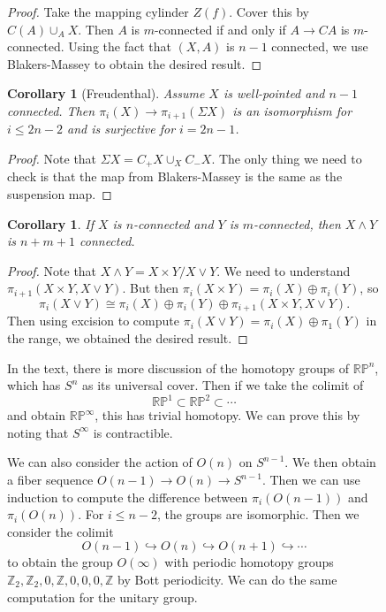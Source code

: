 \documentclass[leqno, openany]{memoir}
\newtheorem{cor}[thm]{Corollary}
\theoremstyle{definition}
\theoremstyle{remark}
\theoremstyle{plain}
\theoremstyle{definition}
\theoremstyle{remark}
\newcommand{\R}{\mathbb{R}}
\newcommand{\Z}{\mathbb{Z}}
\renewcommand{\P}{\mathbb{P}}
\begin{document}
\begin{figure}[H]
\begin{proof} Take the mapping cylinder $Z(f)$. Cover this by $C(A) \cup_A X$.
    Then $A$ is $m$-connected if and only if $A \to CA$ is $m$-connected. Using
    the fact that $(X,A)$ is $n-1$ connected, we use Blakers-Massey to obtain
    the desired result.  \end{proof}

\begin{cor}[Freudenthal] Assume $X$ is well-pointed and $n-1$ connected. Then
$\pi_i(X) \to \pi_{i+1}(\Sigma X)$ is an isomorphism for $i \leq 2n-2$ and is
surjective for $i = 2n-1$.  \end{cor}

\begin{proof} Note that $\Sigma X = C_+X \cup_X C_-X$. The only thing we need
to check is that the map from Blakers-Massey is the same as the suspension map.
\end{proof}

\begin{cor} If $X$ is $n$-connected and $Y$ is $m$-connected, then $X \wedge Y$
is $n+m+1$ connected.  \end{cor}

\begin{proof} Note that $X \wedge Y = X \times Y / X \vee Y$. We need to
    understand $\pi_{i+1}(X \times Y, X \vee Y)$. But then $\pi_i(X \times Y) =
    \pi_i(X) \oplus \pi_i(Y)$, so \[ \pi_i(X \vee Y) \cong \pi_i(X) \oplus
    \pi_i(Y) \oplus \pi_{i+1}(X \times Y, X \vee Y). \] Then using excision to
compute $\pi_i(X \vee Y) = \pi_i(X) \oplus \pi_1(Y)$ in the range, we obtained
the desired result.  \end{proof}

In the text, there is more discussion of the homotopy groups of $\R\P^n$, which
has $S^n$ as its universal cover. Then if we take the colimit of \[ \R\P^1
\subset \R\P^2 \subset \cdots \] and obtain $\R\P^{\infty}$, this has trivial
homotopy. We can prove this by noting that $S^{\infty}$ is contractible.

We can also consider the action of $O(n)$ on $S^{n-1}$. We then obtain a fiber
sequence $O(n-1) \to O(n) \to S^{n-1}$. Then we can use induction to compute
the difference between $\pi_i(O(n-1))$ and $\pi_i(O(n))$. For $i \leq n-2$, the
groups are isomorphic. Then we consider the colimit \[ O(n-1) \hookrightarrow
O(n) \hookrightarrow O(n+1) \hookrightarrow \cdots \] to obtain the group
$O(\infty)$ with periodic homotopy groups $\Z_2, \Z_2, 0, \Z, 0, 0, 0, \Z$ by
Bott periodicity. We can do the same computation for the unitary group.


\end{figure}
\end{document}
